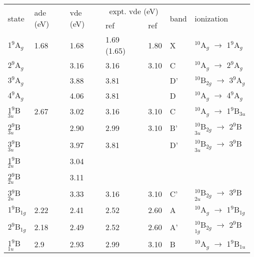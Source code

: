 \begin{refsection}
\begin{table}[htbp!]
\begin{threeparttable}
	\begin{tabular}{@{}lllllll@{}}
  \toprule
 \multirow{2}{*}{state} & \multirow{2}{*}{\acrshort{ade} (eV)} & \multirow{2}{*}{\acrshort{vde} (eV)} & \multicolumn{2}{c}{expt. \acrshort{vde} (eV)} & \multirow{2}{*}{band\tnote{(h)}} & \multirow{2}{*}{ionization}  \\ \cmidrule(lr){4-5}
 					 &         &        & ref \citenum{Zhai06}\tnote{(g)}  	 &  ref \citenum{Tono2003B}  &      &                   \\ \midrule
 1$^9$A$_g$          & 1.68    & 1.68   & 1.69 (1.65)& 1.80   & X    & $^{10}$A$_g$    $\longrightarrow$ 1$^9$A$_g$         \\
 2$^9$A$_g$          &         & 3.16   & 3.16       & 3.10   & C    & $^{10}$A$_g$    $\longrightarrow$ 2$^9$A$_g$         \\
 3$^9$A$_g$          &         & 3.88   & 3.81       &        & D'   & $^{10}$B$_{2g}$ $\longrightarrow$ 3$^9$A$_g$         \\
 4$^9$A$_g$          &         & 4.06   & 3.81       &        & D    & $^{10}$A$_g$    $\longrightarrow$ 4$^9$A$_g$         \\
 1$^9$B$_{3u}$       & 2.67    & 3.02   & 3.16       & 3.10   & C    & $^{10}$A$_g$    $\longrightarrow$ 1$^9$B$_{3u}$      \\
 2$^9$B$_{3u}$       &         & 2.90   & 2.99       & 3.10   & B'   & $^{10}$B$_{2g}$  $\longrightarrow$ 2$^9$B$_{3u}$     \\
 3$^9$B$_{3u}$       &         & 3.97   & 3.81       &        & D'   & $^{10}$B$_{2g}$ $\longrightarrow$ 3$^9$B$_{3u}$      \\
 1$^9$B$_{2u}$       &         & 3.04   &            &        &      &                									   \\
 2$^9$B$_{2u}$       &         & 3.11   &            &        &      &                									   \\
 3$^9$B$_{2u}$       &         & 3.33   & 3.16       & 3.10   & C'   & $^{10}$B$_{2g}$ $\longrightarrow$ 3$^9$B$_{2u}$      \\
 1$^9$B$_{1g}$       & 2.22    & 2.41   & 2.52       & 2.60   & A    & $^{10}$A$_g$    $\longrightarrow$ 1$^9$B$_{1g}$      \\
 2$^9$B$_{1g}$       & 2.18    & 2.49   & 2.52       & 2.60   & A'   & $^{10}$B$_{2g}$ $\longrightarrow$ 2$^9$B$_{1g}$      \\
 1$^9$B$_{1u}$       & 2.9     & 2.93   & 2.99       & 3.10   & B    & $^{10}$A$_g$    $\longrightarrow$ 1$^9$B$_{1u}$      \\

\end{tabular}
\end{threeparttable}
\end{table}
\end{refsection}
